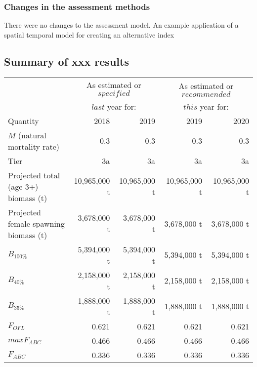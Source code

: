 \documentclass[11pt,]{article}
\begin{document}
\hypertarget{changes-in-the-assessment-methods}{%
\subsubsection{Changes in the assessment
methods}\label{changes-in-the-assessment-methods}}

There were no changes to the assessment model. An example application of
a spatial temporal model for creating an alternative index

\hypertarget{summary-of-xxx-results}{%
\subsection{Summary of xxx results}\label{summary-of-xxx-results}}

\begin{table}[ht]
\centering
\begin{tabular}{lrr|rr}
  \hline
       & \multicolumn{2}{c|}{As estimated or $\mathit{specified}$ } & \multicolumn{2}{c}{As estimated or $\mathit{recommended}$ }  \\
       & \multicolumn{2}{c|}{$\mathit{last}$ year for:}  & \multicolumn{2}{c}{$\mathit{this}$ year for: }               \\
        Quantity & 2018      &2019   & 2019      &2020 \\ 
  \hline
$M$ (natural mortality rate)          &  0.3   &  0.3   &  0.3   & 0.3   \\
Tier                                  &  3a   &  3a   &  3a   & 3a   \\
Projected total (age 3+) biomass (t)  &  10,965,000 t &  10,965,000 t &  10,965,000 t & 10,965,000 t \\
Projected female spawning biomass (t) &  3,678,000 t &  3,678,000 t &  3,678,000 t & 3,678,000 t \\
$B_{100\%}$                           &  5,394,000 t &  5,394,000 t &  5,394,000 t & 5,394,000 t \\
$B_{40\%}$                            &  2,158,000 t &  2,158,000 t &  2,158,000 t & 2,158,000 t \\
$B_{35\%}$                            &  1,888,000 t &  1,888,000 t &  1,888,000 t & 1,888,000 t \\
$F_{OFL}$                             &  0.621   &  0.621   &  0.621   & 0.621   \\
$maxF_{ABC}$                          &  0.466   &  0.466   &  0.466   & 0.466   \\
$F_{ABC}$                             &  0.336   &  0.336   &  0.336   & 0.336   \\

\end{tabular}
\end{table}
\end{document}

